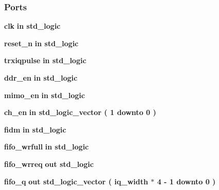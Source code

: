 \subsubsection*{Ports}
 \begin{DoxyCompactItemize}
\item 
{\bf clk}  {\bfseries {\bfseries \textcolor{keywordflow}{in}\textcolor{vhdlchar}{ }}} {\bfseries \textcolor{comment}{std\+\_\+logic}\textcolor{vhdlchar}{ }} 
\item 
{\bf reset\+\_\+n}  {\bfseries {\bfseries \textcolor{keywordflow}{in}\textcolor{vhdlchar}{ }}} {\bfseries \textcolor{comment}{std\+\_\+logic}\textcolor{vhdlchar}{ }} 
\item 
{\bf trxiqpulse}  {\bfseries {\bfseries \textcolor{keywordflow}{in}\textcolor{vhdlchar}{ }}} {\bfseries \textcolor{comment}{std\+\_\+logic}\textcolor{vhdlchar}{ }} 
\item 
{\bf ddr\+\_\+en}  {\bfseries {\bfseries \textcolor{keywordflow}{in}\textcolor{vhdlchar}{ }}} {\bfseries \textcolor{comment}{std\+\_\+logic}\textcolor{vhdlchar}{ }} 
\item 
{\bf mimo\+\_\+en}  {\bfseries {\bfseries \textcolor{keywordflow}{in}\textcolor{vhdlchar}{ }}} {\bfseries \textcolor{comment}{std\+\_\+logic}\textcolor{vhdlchar}{ }} 
\item 
{\bf ch\+\_\+en}  {\bfseries {\bfseries \textcolor{keywordflow}{in}\textcolor{vhdlchar}{ }}} {\bfseries \textcolor{comment}{std\+\_\+logic\+\_\+vector}\textcolor{vhdlchar}{ }\textcolor{vhdlchar}{(}\textcolor{vhdlchar}{ }\textcolor{vhdlchar}{ } \textcolor{vhdldigit}{1} \textcolor{vhdlchar}{ }\textcolor{keywordflow}{downto}\textcolor{vhdlchar}{ }\textcolor{vhdlchar}{ } \textcolor{vhdldigit}{0} \textcolor{vhdlchar}{ }\textcolor{vhdlchar}{)}\textcolor{vhdlchar}{ }} 
\item 
{\bf fidm}  {\bfseries {\bfseries \textcolor{keywordflow}{in}\textcolor{vhdlchar}{ }}} {\bfseries \textcolor{comment}{std\+\_\+logic}\textcolor{vhdlchar}{ }} 
\item 
{\bf fifo\+\_\+wrfull}  {\bfseries {\bfseries \textcolor{keywordflow}{in}\textcolor{vhdlchar}{ }}} {\bfseries \textcolor{comment}{std\+\_\+logic}\textcolor{vhdlchar}{ }} 
\item 
{\bf fifo\+\_\+wrreq}  {\bfseries {\bfseries \textcolor{keywordflow}{out}\textcolor{vhdlchar}{ }}} {\bfseries \textcolor{comment}{std\+\_\+logic}\textcolor{vhdlchar}{ }} 
\item 
{\bf fifo\+\_\+q}  {\bfseries {\bfseries \textcolor{keywordflow}{out}\textcolor{vhdlchar}{ }}} {\bfseries \textcolor{comment}{std\+\_\+logic\+\_\+vector}\textcolor{vhdlchar}{ }\textcolor{vhdlchar}{(}\textcolor{vhdlchar}{ }\textcolor{vhdlchar}{ }\textcolor{vhdlchar}{ }\textcolor{vhdlchar}{ }{\bfseries {\bf iq\+\_\+width}} \textcolor{vhdlchar}{$\ast$}\textcolor{vhdlchar}{ } \textcolor{vhdldigit}{4} \textcolor{vhdlchar}{-\/}\textcolor{vhdlchar}{ } \textcolor{vhdldigit}{1} \textcolor{vhdlchar}{ }\textcolor{keywordflow}{downto}\textcolor{vhdlchar}{ }\textcolor{vhdlchar}{ } \textcolor{vhdldigit}{0} \textcolor{vhdlchar}{ }\textcolor{vhdlchar}{)}\textcolor{vhdlchar}{ }} 
\end{DoxyCompactItemize}


